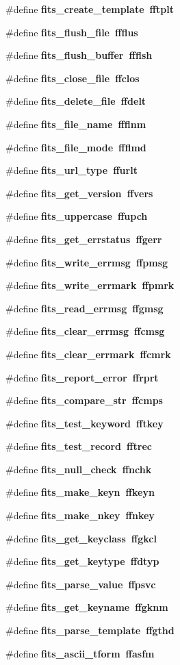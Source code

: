 \begin{CompactItemize}
\#define \bf{fits\_\-create\_\-template}~fftplt
\item 
\#define \bf{fits\_\-flush\_\-file}~ffflus
\item 
\#define \bf{fits\_\-flush\_\-buffer}~ffflsh
\item 
\#define \bf{fits\_\-close\_\-file}~ffclos
\item 
\#define \bf{fits\_\-delete\_\-file}~ffdelt
\item 
\#define \bf{fits\_\-file\_\-name}~ffflnm
\item 
\#define \bf{fits\_\-file\_\-mode}~ffflmd
\item 
\#define \bf{fits\_\-url\_\-type}~ffurlt
\item 
\#define \bf{fits\_\-get\_\-version}~ffvers
\item 
\#define \bf{fits\_\-uppercase}~ffupch
\item 
\#define \bf{fits\_\-get\_\-errstatus}~ffgerr
\item 
\#define \bf{fits\_\-write\_\-errmsg}~ffpmsg
\item 
\#define \bf{fits\_\-write\_\-errmark}~ffpmrk
\item 
\#define \bf{fits\_\-read\_\-errmsg}~ffgmsg
\item 
\#define \bf{fits\_\-clear\_\-errmsg}~ffcmsg
\item 
\#define \bf{fits\_\-clear\_\-errmark}~ffcmrk
\item 
\#define \bf{fits\_\-report\_\-error}~ffrprt
\item 
\#define \bf{fits\_\-compare\_\-str}~ffcmps
\item 
\#define \bf{fits\_\-test\_\-keyword}~fftkey
\item 
\#define \bf{fits\_\-test\_\-record}~fftrec
\item 
\#define \bf{fits\_\-null\_\-check}~ffnchk
\item 
\#define \bf{fits\_\-make\_\-keyn}~ffkeyn
\item 
\#define \bf{fits\_\-make\_\-nkey}~ffnkey
\item 
\#define \bf{fits\_\-get\_\-keyclass}~ffgkcl
\item 
\#define \bf{fits\_\-get\_\-keytype}~ffdtyp
\item 
\#define \bf{fits\_\-parse\_\-value}~ffpsvc
\item 
\#define \bf{fits\_\-get\_\-keyname}~ffgknm
\item 
\#define \bf{fits\_\-parse\_\-template}~ffgthd
\item 
\#define \bf{fits\_\-ascii\_\-tform}~ffasfm
\item 

\end{CompactItemize}
